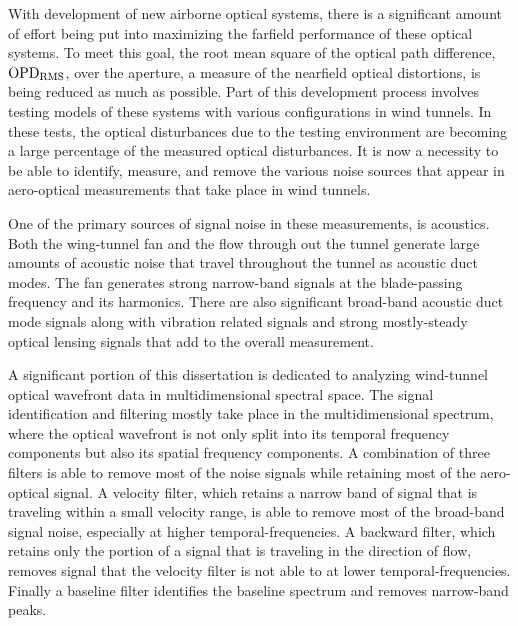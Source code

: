 
With development of new airborne optical systems, there is a significant amount of effort being put into maximizing the farfield performance of these optical systems.
To meet this goal, the root mean square of the optical path difference, $\operatorname{OPD_{RMS}}$, over the aperture, a measure of the nearfield optical distortions, is being reduced as much as possible.
Part of this development process involves testing models of these systems with various configurations in wind tunnels.
In these tests, the optical disturbances due to the testing environment are becoming a large percentage of the measured optical disturbances.
It is now a necessity to be able to identify, measure, and remove the various noise sources that appear in aero-optical measurements that take place in wind tunnels.

One of the primary sources of signal noise in these measurements, is acoustics.
Both the wing-tunnel fan and the flow through out the tunnel generate large amounts of acoustic noise that travel throughout the tunnel as acoustic duct modes.
The fan generates strong narrow-band signals at the blade-passing frequency and its harmonics.
There are also significant broad-band acoustic duct mode signals along with vibration related signals and strong mostly-steady optical lensing signals that add to the overall measurement.

A significant portion of this dissertation is dedicated to analyzing wind-tunnel optical wavefront data in multidimensional spectral space.
The signal identification and filtering mostly take place in the multidimensional spectrum, where the optical wavefront is not only split into its temporal frequency components but also its spatial frequency components.
A combination of three filters is able to remove most of the noise signals while retaining most of the aero-optical signal.
A velocity filter, which retains a narrow band of signal that is traveling within a small velocity range, is able to remove most of the broad-band signal noise, especially at higher temporal-frequencies.
A backward filter, which retains only the portion of a signal that is traveling in the direction of flow, removes signal that the velocity filter is not able to at lower temporal-frequencies.
Finally a baseline filter identifies the baseline spectrum and removes narrow-band peaks.
